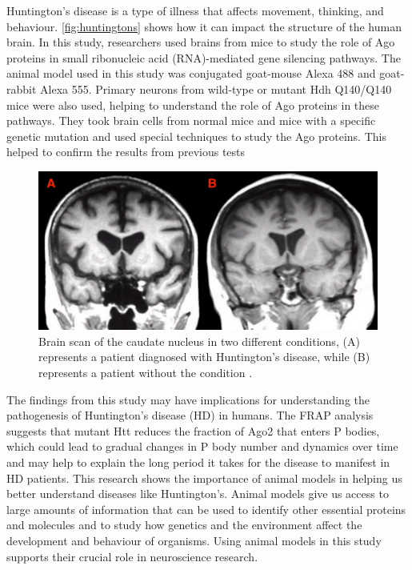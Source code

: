\documentclass[10pt]{article}
\begin{document}
\begin{sloppypar}
  Huntington’s disease is a type of illness that affects movement, thinking, and behaviour. \autoref{fig:huntingtons} shows how it can impact the structure of the human brain. In this study, researchers used brains from mice to study the role of Ago proteins in small ribonucleic acid (RNA)-mediated gene silencing pathways. The animal model used in this study was conjugated goat-mouse Alexa 488 and goat-rabbit Alexa 555. Primary neurons from wild-type or mutant Hdh Q140/Q140 mice were also used, helping to understand the role of Ago proteins in these pathways. They took brain cells from normal mice and mice with a specific genetic mutation and used special techniques to study the Ago proteins. This helped to confirm the results from previous tests

  \vspace{10pt} %
  \begin{figure}[ht]
    \centering
    \includegraphics[width=\textwidth]{figures/huntington.jpg}
    \caption[Brain scan of the caudate nucleus in two different conditions, (A) represents a patient diagnosed with Huntington’s disease, while (B) represents a patient without the condition]{Brain scan of the caudate nucleus in two different conditions, (A) represents a patient diagnosed with Huntington’s disease, while (B) represents a patient without the condition \citep{c_preston_huntingtons_nodate}.}
    \label{fig:huntingtons}
  \end{figure}

  The findings from this study may have implications for understanding the pathogenesis of Huntington’s disease (HD) in humans. The FRAP analysis suggests that mutant Htt reduces the fraction of Ago2 that enters P bodies, which could lead to gradual changes in P body number and dynamics over time and may help to explain the long period it takes for the disease to manifest in HD patients. This research shows the importance of animal models in helping us better understand diseases like Huntington’s. Animal models give us access to large amounts of information that can be used to identify other essential proteins and molecules and to study how genetics and the environment affect the development and behaviour of organisms. Using animal models in this study supports their crucial role in neuroscience research.


\end{sloppypar}
\end{document}
